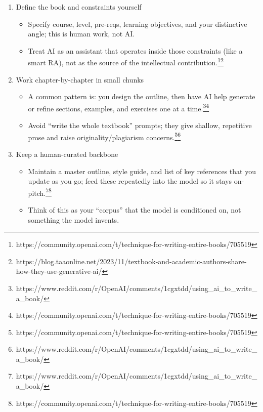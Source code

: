 \documentclass[
  11pt,
]{article}
\providecommand{\tightlist}{%
  \setlength{\itemsep}{0pt}\setlength{\parskip}{0pt}}
\begin{document}
\begin{enumerate}
\def\labelenumi{\arabic{enumi}.}
\tightlist
\item
  Define the book and constraints yourself

  \begin{itemize}
  \tightlist
  \item
    Specify course, level, pre-reqs, learning objectives, and your distinctive angle; this is human work, not AI.
  \item
    Treat AI as an assistant that operates inside those constraints (like a smart RA), not as the source of the intellectual contribution.\footnote{https://community.openai.com/t/technique-for-writing-entire-books/705519}\footnote{https://blog.taaonline.net/2023/11/textbook-and-academic-authors-share-how-they-use-generative-ai/}
  \end{itemize}
\item
  Work chapter-by-chapter in small chunks

  \begin{itemize}
  \tightlist
  \item
    A common pattern is: you design the outline, then have AI help generate or refine sections, examples, and exercises one at a time.\footnote{https://www.reddit.com/r/OpenAI/comments/1cgxtdd/using\_ai\_to\_write\_a\_book/}\footnote{https://community.openai.com/t/technique-for-writing-entire-books/705519}
  \item
    Avoid ``write the whole textbook'' prompts; they give shallow, repetitive prose and raise originality/plagiarism concerns.\footnote{https://community.openai.com/t/technique-for-writing-entire-books/705519}\footnote{https://www.reddit.com/r/OpenAI/comments/1cgxtdd/using\_ai\_to\_write\_a\_book/}
  \end{itemize}
\item
  Keep a human‑curated backbone

  \begin{itemize}
  \tightlist
  \item
    Maintain a master outline, style guide, and list of key references that you update as you go; feed these repeatedly into the model so it stays on-pitch.\footnote{https://www.reddit.com/r/OpenAI/comments/1cgxtdd/using\_ai\_to\_write\_a\_book/}\footnote{https://community.openai.com/t/technique-for-writing-entire-books/705519}
  \item
    Think of this as your ``corpus'' that the model is conditioned on, not something the model invents.
  \end{itemize}
\end{enumerate}
\end{document}
